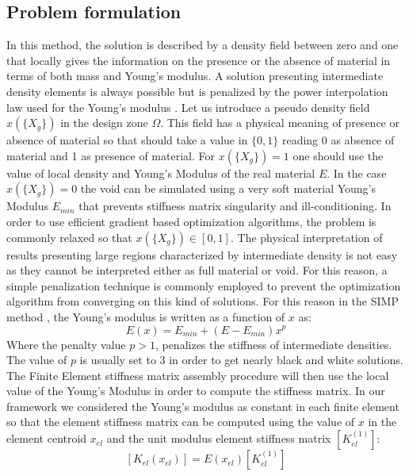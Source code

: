 \subsection{Problem formulation}
In this method, the solution is described by a density field between zero and one that locally gives the information on the presence or the absence of material in terms of both mass and Young's modulus. 
A solution presenting intermediate density elements is always possible but is penalized by the power interpolation law used for the Young's modulus \cite{bendsoe1989optimal}.  Let us introduce a pseudo density field $x(\lbrace X_g \rbrace)$ in the design zone $\Omega$. This field has a physical meaning of presence or absence of material so that should take a value in $\{0,1\}$ reading 0 as absence of material and 1 as presence of material. For $x(\lbrace X_g \rbrace)=1$ one should use the value of local density and Young's Modulus of the real material $E$. In the case $x(\lbrace X_g \rbrace)=0$ the void can be simulated using a very soft material Young's Modulus $E_{min}$ that prevents stiffness matrix singularity and ill-conditioning. 
In order to use efficient gradient based optimization algorithms, the problem is commonly relaxed so that $x(\lbrace X_g \rbrace)\in [0,1]$. The physical interpretation of results presenting large regions characterized by intermediate density is not easy as they cannot be interpreted either as full material or void. For this reason, a simple penalization technique is commonly employed to prevent the optimization algorithm from converging on this kind of solutions. For this reason in the SIMP method \cite{bendsoe1989optimal}, the Young's modulus is written as a function of $x$ as:
\begin{equation}
\label{eq.6}
E(x)=E_{min}+(E-E_{min})x^p
\end{equation}
Where the penalty value $p>1$, penalizes the stiffness of intermediate densities.
The value of $p$ is usually set to 3 in order to get nearly black and white solutions. 
The Finite Element stiffness matrix assembly procedure will then use the local value of the Young's Modulus in order to compute the stiffness matrix. In our framework we considered the Young's modulus as constant in each finite element so that the element stiffness matrix can be computed using the value of $x$ in the element centroid $x_{el}$ and the unit modulus element stiffness matrix $\left[K_{el}^{(1)}\right]$:
\begin{equation}
\label{eq.7}
\left[K_{el}(x_{el})\right]=E(x_{el})\left[K_{el}^{(1)}\right]
\end{equation}
